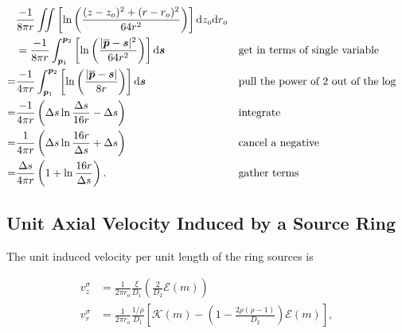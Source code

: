 
\begin{align}
&\frac{-1}{8\pi r} \iint\left[ \ln\left(\frac{(z-z_o)^2 + (r-r_o)^2}{64r^2}\right)\right] \mathrm{d} z_o \mathrm{d} r_o\\
&=
    \frac{-1}{8\pi r} \int_{\bm{p}_1}^{\bm{p}_2}\left[ \ln\left(\frac{|\overline{\bm{p}}-\bm{s}|^2}{64r^2}\right)\right] \mathrm{d}\bm{s} && \text{get in terms of single variable}\\
=&
\frac{-1}{4\pi r} \int_{\bm{p}_1}^{\bm{p}_2}\left[ \ln\left(\frac{|\overline{\bm{p}}-\bm{s}|}{8r}\right)\right] \mathrm{d}\bm{s} && \text{pull the power of 2 out of the log}\\
=&
\frac{-1}{4\pi r} \left( \Delta s \ln\frac{\Delta s}{16 r} - \Delta s\right) && \text{integrate}\\
=&
\frac{1}{4\pi r} \left( \Delta s \ln\frac{16 r}{\Delta s} + \Delta s\right) && \text{cancel a negative}\\
=&
\frac{\Delta s}{4\pi r} \left( 1 + \ln\frac{16 r}{\Delta s}\right). && \text{gather terms}
\end{align}






\subsection{Unit Axial Velocity Induced by a Source Ring}%

The unit induced velocity per unit length of the ring sources is

\begin{subequations}
    \label{eqn:ringsourceinducedvelocity}
    \begin{align}
    \label{eqn:ringsourceinducedvelocityaxial}
        v_{z}^\sigma &= \frac{1}{2 \pi r_o}\frac{\xi}{ D_1} \left(\frac{2 }{D_2} \mathcal{E}(m)\right) \\
    \label{eqn:ringsourceinducedvelocityradial}
        v_{r}^\sigma &= \frac{1}{2 \pi r_o}\frac{1/\rho}{ D_1}  \left[ \mathcal{K}(m) -   \left( 1 - \frac{2\rho(\rho-1)}{D_2} \right) \mathcal{E}(m)  \right],
    \end{align}
\end{subequations}


